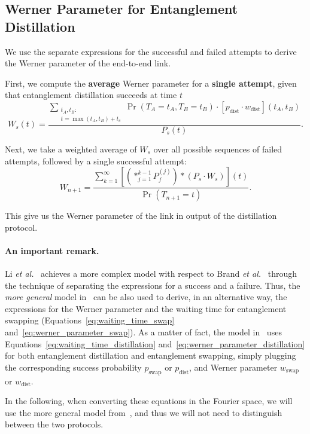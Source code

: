 \documentclass{masterthesis}
\begin{document}
\subsection{Werner Parameter for Entanglement Distillation}

We use the separate expressions for the successful and failed attempts to derive the Werner parameter of the end-to-end link. 

First, we compute the \textbf{average} Werner parameter for a \textbf{single attempt}, given that entanglement distillation succeeds at time $t$
\begin{equation}
    W_s(t) = \frac{\sum_{\substack{t_A, t_B : \\ t = \max(t_A, t_B) + t_c}} \Pr(T_A = t_A, T_B = t_B) \cdot [p_\text{dist} \cdot w_\text{dist}](t_A, t_B)}{P_s(t)} .
\end{equation}

Next, we take a weighted average of $W_s$ over all possible sequences of failed attempts, followed by a single successful attempt:
\begin{equation}\label{eq:werner_parameter_distillation}
    W_{n+1} = \frac{\sum_{k=1}^{\infty} \left[ \left( \ast_{j=1}^{k-1} P_f^{(j)} \right) \ast (P_s \cdot W_s) \right] (t)}{\Pr(T_{n+1} = t)}.
\end{equation}

This give us the Werner parameter of the link in output of the distillation protocol.

\paragraph*{An important remark.} Li \textit{et al.}~\cite{Li_2021} achieves a more complex model with respect to Brand \textit{et al.}~\cite{Brand_2020} through the technique of separating the expressions for a success and a failure. Thus, the \textit{more general} model in~\cite{Li_2021} can be also used to derive, in an alternative way, the expressions for the Werner parameter and the waiting time for entanglement swapping (Equations~\ref{eq:waiting_time_swap} and~\ref{eq:werner_parameter_swap}).
As a matter of fact, the model in~\cite{Li_2021} uses Equations~\ref{eq:waiting_time_distillation} and~\ref{eq:werner_parameter_distillation} for both entanglement distillation and entanglement swapping, simply plugging the corresponding success probability $p_\text{swap}$ or $p_\text{dist}$, and Werner parameter $w_\text{swap}$ or $w_\text{dist}$.

In the following, when converting these equations in the Fourier space, we will use the more general model from~\cite{Li_2021}, and thus we will not need to distinguish between the two protocols.
\end{document}
